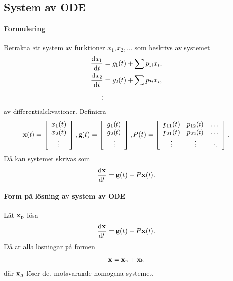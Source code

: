 \subsection{System av ODE}

\paragraph{Formulering}
Betrakta ett system av funktioner $x_{1}, x_{2}, \dots$ som beskrivs av systemet
\begin{align*}
	\dv[]{x_{1}}{t} (t) &= g_{1}(t) + \sum p_{1i}x_{i}, \\
	\dv[]{x_{2}}{t} (t) &= g_{2}(t) + \sum p_{2i}x_{i}, \\
	\vdots
\end{align*}
av differentialekvationer. Definiera
\begin{align*}
	\vb{x}(t) =\left[
	\begin{array}{c}
		x_{1}(t) \\
		x_{2}(t) \\
		\vdots
	\end{array}\right],
	\vb{g}(t) =\left[
	\begin{array}{c}
		g_{1}(t) \\
		g_{2}(t) \\
		\vdots
	\end{array}\right],
	P(t) =\left[
	\begin{array}{ccc}
		p_{11}(t) & p_{12}(t) & \dots \\
		p_{21}(t) & p_{22}(t) & \dots \\
		\vdots    & \vdots    & \ddots
	\end{array}\right].
\end{align*}
Då kan systemet skrivas som
\begin{align*}
	\dv[]{\vb{x}}{t} (t) = \vb{g}(t) + P\vb{x}(t).
\end{align*}

\paragraph{Form på lösning av system av ODE}
Låt $\vb{x}_{\text{p}}$ lösa
\begin{align*}
	\dv[]{\vb{x}}{t} (t) = \vb{g}(t) + P\vb{x}(t).
\end{align*}
Då är alla lösningar på formen
\begin{align*}
	\vb{x} = \vb{x}_{\text{p}} + \vb{x}_{\text{h}}
\end{align*}
där $\vb{x}_{\text{h}}$ löser det motsvarande homogena systemet.

